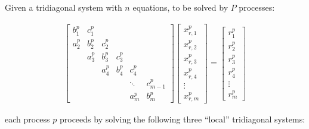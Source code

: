 \documentclass{elsarticle}
\begin{document}
Given a tridiagonal system with  $n$ equations,
to be solved by $P$ processes:

\begin{align}
& \begin{bmatrix}
b_1^p & c_1^p \\
a_2^p & b_2^p & c_2^p \\
      & a_3^p & b_3^p & c_3^p \\
      &       & a_4^p & b_4^p & c_4^p \\
      &       &       &       &  \ddots & c_{m-1}^p\\
      &       &       &       &     a_{m}^p  & b_{m}^p
\end{bmatrix}
\begin{bmatrix}
x_{r,1}^p \\
x_{r,2}^p \\
x_{r,3}^p \\
x_{r,4}^p \\
\vdots \\
x_{r,m}^p
\end{bmatrix}
=
\begin{bmatrix}
r_1^p \\
r_2^p \\
r_3^p \\
r_4^p \\
\vdots \\
r_m^p
\end{bmatrix} & \label{eqn:global-system} 
\end{align}

each process $p$ proceeds by solving the following three ``local''
tridiagonal systems:
\end{document}
